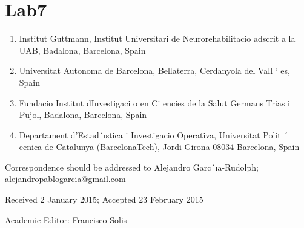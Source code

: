 
\chapter{Lab7}




\begin{flushleft}
\begin{enumerate}
\item Institut Guttmann, Institut Universitari de Neurorehabilitacio adscrit a la UAB, Badalona, Barcelona, Spain \label{l1}
\item Universitat Autonoma de Barcelona, Bellaterra, Cerdanyola del Vall ` es, Spain \label{l2}
\item Fundacio Institut dInvestigaci  o en Ci  encies de la Salut Germans Trias i Pujol, Badalona, Barcelona, Spain\label{l3}
\item Departament d’Estad´ıstica i Investigacio Operativa, Universitat Polit ´ ecnica de Catalunya (BarcelonaTech), Jordi Girona
08034 Barcelona, Spain\label{l4}
\end{enumerate}

Correspondence should be addressed to Alejandro Garc´ıa-Rudolph; alejandropablogarcia@gmail.com \newline

Received 2 January 2015; Accepted 23 February 2015 \newline

Academic Editor: Francisco Solis \newline




\end{flushleft}
